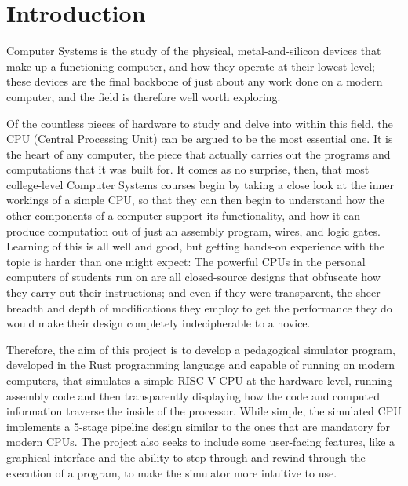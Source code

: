 \documentclass[12pt,twoside]{reedthesis}
\begin{document}
\chapter*{Introduction}


Computer Systems is the study of the physical, metal-and-silicon devices that make up a functioning computer, and how they operate at their lowest level; these devices are the final backbone of just about any work done on a modern computer, and the field is therefore well worth exploring.

Of the countless pieces of hardware to study and delve into within this field, the CPU (Central Processing Unit) can be argued to be the most essential one. It is the heart of any computer, the piece that actually carries out the programs and computations that it was built for. It comes as no surprise, then, that most college-level Computer Systems courses begin by taking a close look at the inner workings of a simple CPU, so that they can then begin to understand how the other components of a computer support its functionality, and how it can produce computation out of just an assembly program, wires, and logic gates. Learning of this is all well and good, but getting hands-on experience with the topic is harder than one might expect: The powerful CPUs in the personal computers of students run on are all closed-source designs that obfuscate how they carry out their instructions; and even if they were transparent, the sheer breadth and depth of modifications they employ to get the performance they do would make their design completely indecipherable to a novice.

Therefore, the aim of this project is to develop a pedagogical simulator program, developed in the Rust programming language and capable of running on modern computers, that simulates a simple RISC-V CPU at the hardware level, running assembly code and then transparently displaying how the code and computed information traverse the inside of the processor. While simple, the simulated CPU implements a 5-stage pipeline design similar to the ones that are mandatory for modern CPUs. The project also seeks to include some user-facing features, like a graphical interface and the ability to step through and rewind through the execution of a program, to make the simulator more intuitive to use.
\end{document}
